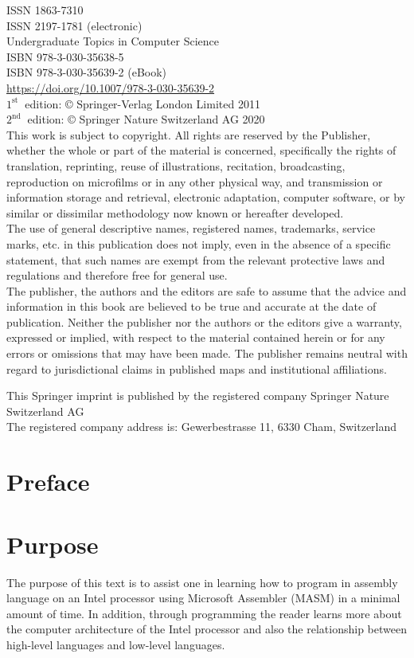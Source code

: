 \documentclass[10pt]{book}
\begin{document}
ISSN 1863-7310\\
ISSN 2197-1781 (electronic)\\
Undergraduate Topics in Computer Science\\
ISBN 978-3-030-35638-5\\
ISBN 978-3-030-35639-2 (eBook)\\
\href{https://doi.org/10.1007/978-3-030-35639-2}{https://doi.org/10.1007/978-3-030-35639-2}\\
$1^{\text {st }}$ edition: © Springer-Verlag London Limited 2011\\
$2^{\text {nd }}$ edition: © Springer Nature Switzerland AG 2020\\
This work is subject to copyright. All rights are reserved by the Publisher, whether the whole or part of the material is concerned, specifically the rights of translation, reprinting, reuse of illustrations, recitation, broadcasting, reproduction on microfilms or in any other physical way, and transmission or information storage and retrieval, electronic adaptation, computer software, or by similar or dissimilar methodology now known or hereafter developed.\\
The use of general descriptive names, registered names, trademarks, service marks, etc. in this publication does not imply, even in the absence of a specific statement, that such names are exempt from the relevant protective laws and regulations and therefore free for general use.\\
The publisher, the authors and the editors are safe to assume that the advice and information in this book are believed to be true and accurate at the date of publication. Neither the publisher nor the authors or the editors give a warranty, expressed or implied, with respect to the material contained herein or for any errors or omissions that may have been made. The publisher remains neutral with regard to jurisdictional claims in published maps and institutional affiliations.

This Springer imprint is published by the registered company Springer Nature Switzerland AG\\
The registered company address is: Gewerbestrasse 11, 6330 Cham, Switzerland
\section{Preface}
\section{Purpose}
The purpose of this text is to assist one in learning how to program in assembly language on an Intel processor using Microsoft Assembler (MASM) in a minimal amount of time. In addition, through programming the reader learns more about the computer architecture of the Intel processor and also the relationship between high-level languages and low-level languages.
\end{document}

